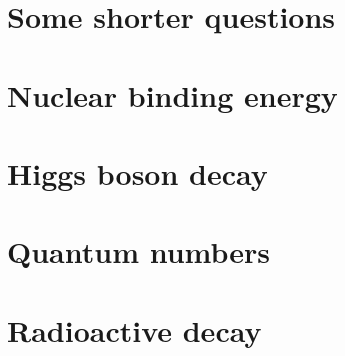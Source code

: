\documentclass[]{article}
\begin{document}
\section{Some shorter questions}


\section{Nuclear binding energy}


\section{Higgs boson decay}


\section{}

\section{Quantum numbers}


\section{}

\section{Radioactive decay}

\end{document}
